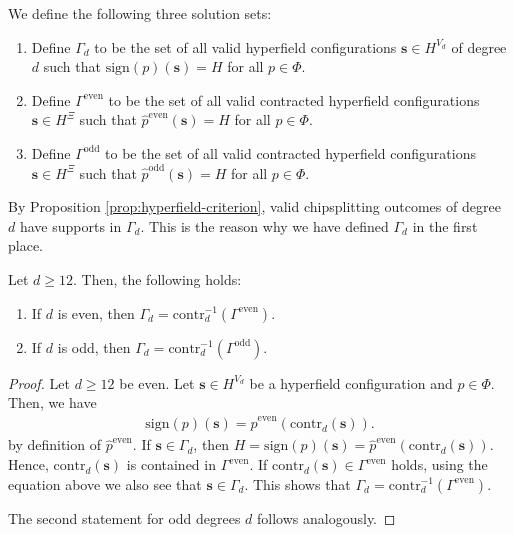 \begin{definition}
    We define the following three solution sets:
    \begin{enumerate}
        \item     Define \( \Gamma_d \) to be the set of all valid hyperfield configurations \( \mathbf{s} \in H^{V_d} \) of degree \( d \) such that \( \mathrm{sign}(p)(\mathbf{s}) = H \) for all \( p \in \Phi \).

        \item     Define \( \Gamma^{\mathrm{even}} \) to be the set of all valid contracted hyperfield configurations \( \mathbf{s} \in H^{\Xi} \) such that \( \hat p^{\mathrm{even}}(\mathbf{s}) = H \) for all \( p \in \Phi \).

        \item     Define \( \Gamma^{\mathrm{odd}} \) to be the set of all valid contracted hyperfield configurations \( \mathbf{s} \in H^{\Xi} \) such that \( \hat p^{\mathrm{odd}}(\mathbf{s}) = H \) for all \( p \in \Phi \).
    \end{enumerate}
\end{definition}

By Proposition \ref{prop:hyperfield-criterion}, valid chipsplitting outcomes of degree \( d \) have supports in \( \Gamma_d \). This is the reason why we have defined \( \Gamma_d \) in the first place. 

\begin{proposition}\label{prop:sign-sikjsfnf3223423432}
    Let \( d \geq 12 \). Then, the following holds:
    \begin{enumerate}
        \item If \( d \) is even, then \( \Gamma_d = \mathrm{contr}_d^{-1}(\Gamma^{\mathrm{even}}) \).
       \item If \( d \) is odd, then \( \Gamma_d = \mathrm{contr}_d^{-1}(\Gamma^{\mathrm{odd}}) \).
    \end{enumerate}
\end{proposition}

\begin{proof}
    Let \( d \geq 12 \) be even. Let \( \mathbf{s} \in {H}^{V_d} \) be a hyperfield configuration and \( p \in \Phi \). Then, we have 
    \begin{align*}
        \mathrm{sign}(p)(\mathbf{s}) = \hat p^{\mathrm{even}}(\mathrm{contr}_d(\mathbf{s})).
    \end{align*}
    by definition of \( \hat p^{\mathrm{even}} \). If \( \mathbf{s} \in \Gamma_d \), then \( H = \mathrm{sign}(p)(\mathbf{s}) = \hat p^{\mathrm{even}}(\mathrm{contr}_d(\mathbf{s})) \). Hence, \( \mathrm{contr}_d(\mathbf{s}) \) is contained in \( \Gamma^{\mathrm{even}} \). If \( \mathrm{contr}_d(\mathbf{s}) \in \Gamma^{\mathrm{even}} \) holds, using the equation above we also see that \( \mathbf{s} \in \Gamma_d \). This shows that \( \Gamma_d = \mathrm{contr}_d^{-1}(\Gamma^{\mathrm{even}}) \).

    The second statement for odd degrees \( d \) follows analogously.
\end{proof}


